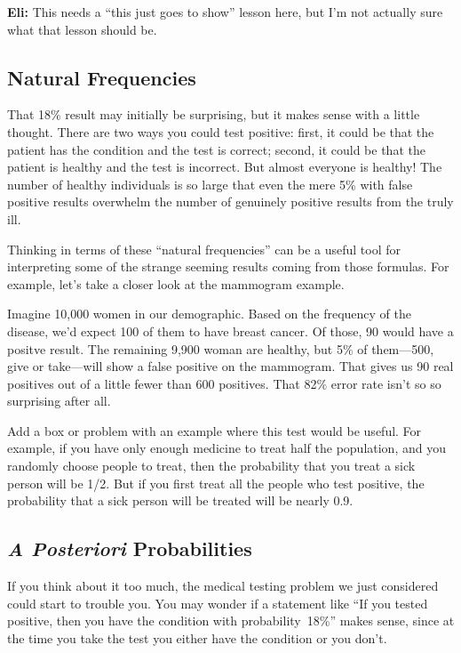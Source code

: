 \begin{editingnotes}
\textbf{Eli:} This needs a ``this just goes to show'' lesson here, but I'm not
actually sure what that lesson should be.
\end{editingnotes}

\subsection{Natural Frequencies}

That 18\% result may initially be surprising, but it makes sense with
a little thought.  There are two ways you could test positive: first,
it could be that the patient has the condition and the test is
correct; second, it could be that the patient is healthy and the test
is incorrect.  But almost everyone is healthy!  The number of healthy
individuals is so large that even the mere 5\% with false positive
results overwhelm the number of genuinely positive results from the
truly ill.

Thinking in terms of these ``natural frequencies'' can be a useful
tool for interpreting some of the strange seeming results coming from
those formulas.  For example, let's take a closer look at the
mammogram example.

Imagine 10,000 women in our demographic.  Based on the frequency of
the disease, we'd expect 100 of them to have breast cancer.  Of those,
90 would have a positve result.  The remaining 9,900 woman are healthy,
but 5\% of them---500, give or take---will show a false positive on
the mammogram.  That gives us 90 real positives out of a little fewer
than 600 positives.  That 82\% error rate isn't so so surprising after all.

\begin{editingnotes}
Add a box or problem with an example where this test would be useful.
For example, if you have only enough medicine to treat half the
population, and you randomly choose people to treat, then the
probability that you treat a sick person will be 1/2.  But if you
first treat all the people who test positive, the probability that a
sick person will be treated will be nearly 0.9.
\end{editingnotes}


\subsection{\emph{A Posteriori} Probabilities}\label{aposteriori_subsec}

If you think about it too much, the medical testing problem we just
considered could start to trouble you.  You may wonder if a statement
like ``If you tested positive, then you have the condition with
probability~18\%'' makes sense, since at the time you take the test
you either have the condition or you don't.

